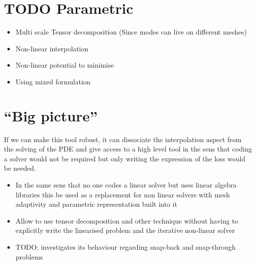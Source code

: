 

\section{TODO Parametric}

\begin{itemize}
    \item Multi scale Tensor decomposition (Since modes can live on different meshes)
    \item Non-linear interpolation
    \item Non-linear potential to minimise
    \item Using mixed formulation
\end{itemize}
\section{``Big picture''}

If we can make this tool robust, it can dissociate the interpolation aspect from the solving of the PDE and give access to a high level tool in the sens that coding a solver would not be required but only writing the expression of the loss would be needed.

\begin{itemize}
    \item In the same sens that no one codes a linear solver but uses linear algebra libraries this be used as a replacement for non linear solvers with mesh adaptivity and parametric representation built into it
    \item Allow to use tensor decomposition and other technique without having to explicitly write the linearised problem and the iterative non-linear solver
    \item TODO: investigates its behaviour regarding snap-back and snap-through problems
\end{itemize}
